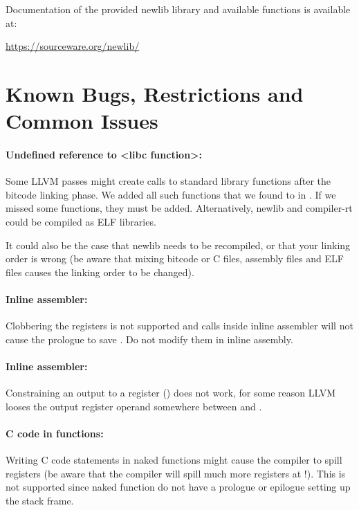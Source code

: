 Documentation of the provided newlib library and available functions is available at:

\url{https://sourceware.org/newlib/}

\section{Known Bugs, Restrictions and Common Issues}
\label{sec:toolchain:knownbugs}


\paragraph{Undefined reference to <libc function>:} Some LLVM passes might create calls to standard library functions
after the bitcode linking phase. We added all such functions that we found to  in .
If we missed some functions, they must be added. Alternatively, newlib and compiler-rt could be compiled as ELF libraries.

It could also be the case that newlib needs to be recompiled, or that your linking order is wrong (be aware
that mixing bitcode or C files, assembly files and ELF files causes the linking order to be changed).


\paragraph{Inline assembler:} Clobbering the registers  is not supported and calls inside
inline assembler will not cause the prologue to save . Do not modify them in inline assembly.


\paragraph{Inline assembler:} Constraining an output to a register () does not work, for some reason
LLVM looses the output register operand somewhere between  and
.


\paragraph{C code in  functions:} Writing C code statements in naked functions might cause
the compiler to spill registers (be aware that the compiler will spill much more registers at !). 
This is not supported since naked function do not have a prologue or epilogue setting up the stack frame.


